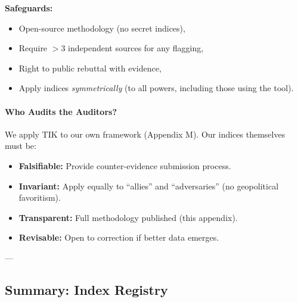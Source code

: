 \documentclass[11pt,a4paper]{article}
\theoremstyle{definition}
\theoremstyle{remark}
\begin{document}
\textbf{Safeguards:}
\begin{itemize}
\item Open-source methodology (no secret indices),
\item Require $>3$ independent sources for any flagging,
\item Right to public rebuttal with evidence,
\item Apply indices \textit{symmetrically} (to all powers, including those using the tool).
\end{itemize}

\paragraph{Who Audits the Auditors?}
We apply TIK to our own framework (Appendix M). Our indices themselves must be:
\begin{itemize}
\item \textbf{Falsifiable:} Provide counter-evidence submission process.
\item \textbf{Invariant:} Apply equally to ``allies'' and ``adversaries'' (no geopolitical favoritism).
\item \textbf{Transparent:} Full methodology published (this appendix).
\item \textbf{Revisable:} Open to correction if better data emerges.
\end{itemize}

---

\subsection{Summary: Index Registry}
\end{document}
